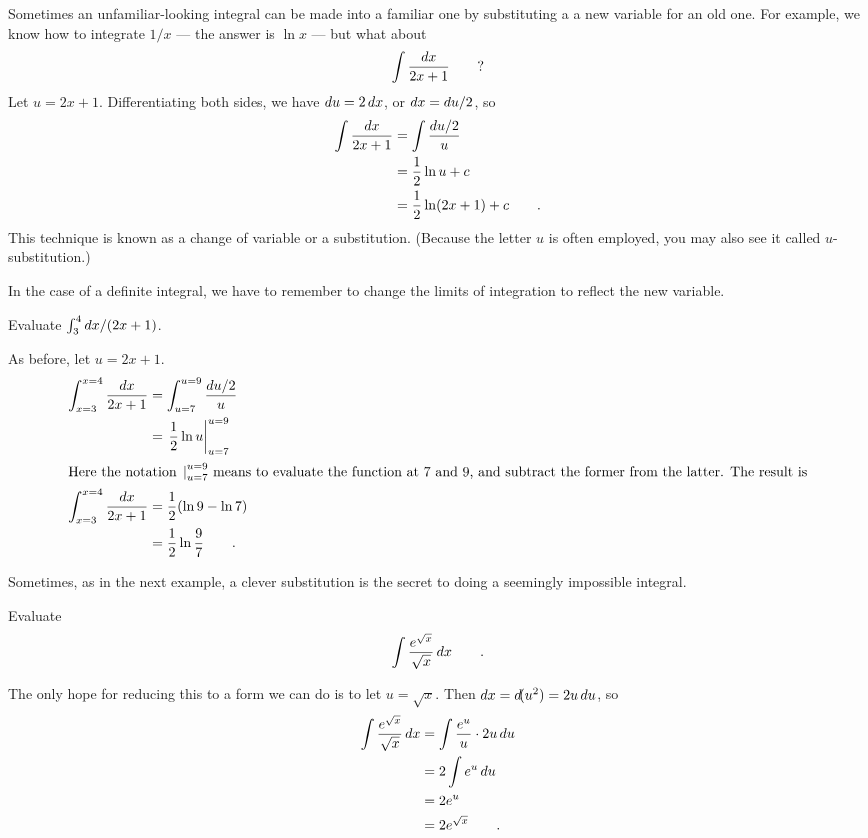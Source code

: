Sometimes an unfamiliar-looking integral can be made into a familiar one by substituting a
a new variable for an old one. For example, we know how to integrate $1/x$ --- the answer
is $\ln x$ --- but what about
\begin{equation*}
  \int \frac{\mathop{d\!} x}{2x+1}   \qquad ?
\end{equation*}
Let $u=2x+1$. Differentiating both sides, we have $\mathop{d\!} u=2\mathop{d\!} x$, or $\mathop{d\!} x=\mathop{d\!} u/2$, so
\begin{align*}
  \int \frac{\mathop{d\!} x}{2x+1}   &= \int \frac{\mathop{d\!} u/2}{u} \\
       &= \frac{1}{2}\ln u + c \\
       &= \frac{1}{2}\ln(2x+1) +c \qquad .
\end{align*}
This technique is known as a change of variable or a substitution. (Because the letter $u$ is often
employed, you may also see it called $u$-substitution.)

In the case of a definite integral, we have to remember to change the limits of integration
to reflect the new variable.

\begin{eg}
\egquestion Evaluate $\int_3^4 \mathop{d\!} x/(2x+1)$.

\eganswer As before, let $u=2x+1$.
\begin{align*}
  \int_{x=3}^{x=4} \frac{\mathop{d\!} x}{2x+1}   &= \int_{u=7}^{u=9} \frac{\mathop{d\!} u/2}{u} \\
       &= \left.\frac{1}{2}\ln u\right|_{u=7}^{u=9} \\
\intertext{Here the notation $\left.\right|_{u=7}^{u=9}$ means to evaluate the function at
7 and 9, and subtract the former from the latter. The result is}
  \int_{x=3}^{x=4} \frac{\mathop{d\!} x}{2x+1}  &= \frac{1}{2}(\ln 9-\ln 7) \\
            &=\frac{1}{2}\ln\frac{9}{7} \qquad .
\end{align*}
\end{eg}

Sometimes, as in the next example, a clever substitution is the secret to doing a
seemingly impossible integral.

\begin{eg}\label{eg:not-so-tricky}
\egquestion Evaluate
\begin{equation*}
  \int \frac{e^{\sqrt x}}{\sqrt x} \mathop{d\!} x \qquad .
\end{equation*}

\eganswer The only hope for reducing this to a form we can do is to let
$u=\sqrt x$. Then $\mathop{d\!} x=\mathop{d\!}(u^2)=2u\mathop{d\!} u$, so
\begin{align*}
  \int \frac{e^{\sqrt x}}{\sqrt x} \mathop{d\!} x &=   \int \frac{e^u}{u} \cdot 2u\mathop{d\!} u \\
             &= 2 \int e^u \mathop{d\!} u \\
             &= 2e^u \\
             &= 2e^{\sqrt{x}} \qquad .
\end{align*}
\end{eg}

